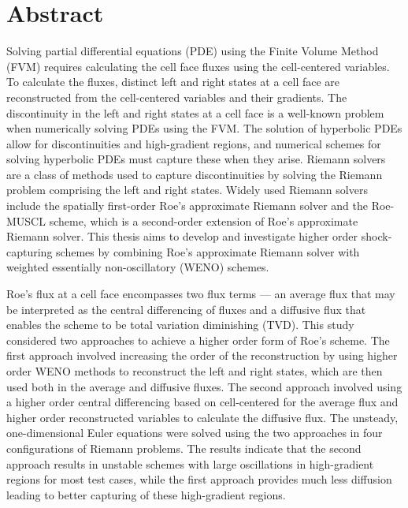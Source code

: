 \chapter*{Abstract}
\makeabstract

Solving partial differential equations (PDE) using the Finite Volume Method (FVM) requires calculating the cell face fluxes using the cell-centered variables. To calculate the fluxes, distinct left and right states at a cell face are reconstructed from the cell-centered variables and their gradients. The discontinuity in the left and right states at a cell face is a well-known problem when numerically solving PDEs using the FVM. The solution of hyperbolic PDEs allow for discontinuities and high-gradient regions, and numerical schemes for solving hyperbolic PDEs must capture these when they arise. Riemann solvers are a class of methods used to capture discontinuities by solving the Riemann problem comprising the left and right states. Widely used Riemann solvers include the spatially first-order Roe's approximate Riemann solver and the Roe-MUSCL scheme, which is a second-order extension of Roe's approximate Riemann solver.  This thesis aims to develop and investigate higher order shock-capturing schemes by combining Roe's approximate Riemann solver with weighted essentially non-oscillatory (WENO) schemes.

Roe's flux at a cell face encompasses two flux terms --- an average flux that may be interpreted as the central differencing of fluxes and a diffusive flux that enables the scheme to be total variation diminishing (TVD). This study considered two approaches to achieve a higher order form of Roe's scheme. The first approach involved increasing the order of the reconstruction by using higher order WENO methods to reconstruct the left and right states, which are then used both in the average and diffusive fluxes. The second approach involved using a higher order central differencing based on cell-centered for the average flux and higher order reconstructed variables to calculate the diffusive flux. The unsteady, one-dimensional Euler equations were solved using the two approaches in four configurations of Riemann problems. The results indicate that the second approach results in unstable schemes with large oscillations in high-gradient regions for most test cases, while the first approach provides much less diffusion leading to better capturing of these high-gradient regions.




\abstractsig
